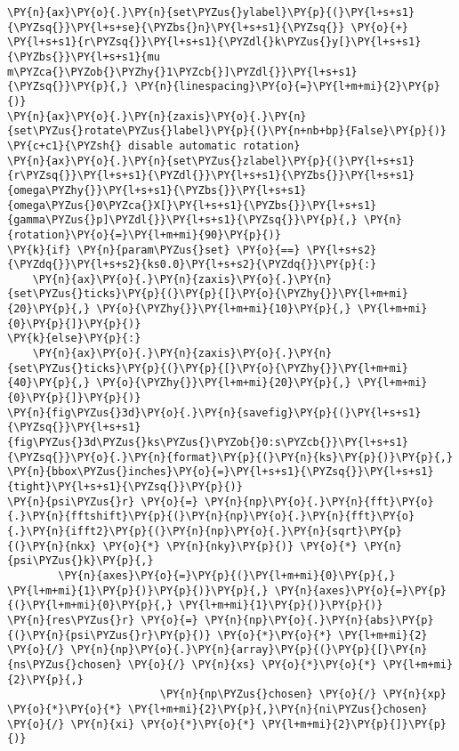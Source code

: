 \begin{Verbatim}[commandchars=\\\{\}]
\PY{n}{ax}\PY{o}{.}\PY{n}{set\PYZus{}ylabel}\PY{p}{(}\PY{l+s+s1}{\PYZsq{}}\PY{l+s+se}{\PYZbs{}n}\PY{l+s+s1}{\PYZsq{}} \PY{o}{+} \PY{l+s+s1}{r\PYZsq{}}\PY{l+s+s1}{\PYZdl{}k\PYZus{}y[}\PY{l+s+s1}{\PYZbs{}}\PY{l+s+s1}{mu m\PYZca{}\PYZob{}\PYZhy{}1\PYZcb{}]\PYZdl{}}\PY{l+s+s1}{\PYZsq{}}\PY{p}{,} \PY{n}{linespacing}\PY{o}{=}\PY{l+m+mi}{2}\PY{p}{)}
\PY{n}{ax}\PY{o}{.}\PY{n}{zaxis}\PY{o}{.}\PY{n}{set\PYZus{}rotate\PYZus{}label}\PY{p}{(}\PY{n+nb+bp}{False}\PY{p}{)}  \PY{c+c1}{\PYZsh{} disable automatic rotation}
\PY{n}{ax}\PY{o}{.}\PY{n}{set\PYZus{}zlabel}\PY{p}{(}\PY{l+s+s1}{r\PYZsq{}}\PY{l+s+s1}{\PYZdl{}}\PY{l+s+s1}{\PYZbs{}}\PY{l+s+s1}{omega\PYZhy{}}\PY{l+s+s1}{\PYZbs{}}\PY{l+s+s1}{omega\PYZus{}0\PYZca{}X[}\PY{l+s+s1}{\PYZbs{}}\PY{l+s+s1}{gamma\PYZus{}p]\PYZdl{}}\PY{l+s+s1}{\PYZsq{}}\PY{p}{,} \PY{n}{rotation}\PY{o}{=}\PY{l+m+mi}{90}\PY{p}{)}
\PY{k}{if} \PY{n}{param\PYZus{}set} \PY{o}{==} \PY{l+s+s2}{\PYZdq{}}\PY{l+s+s2}{ks0.0}\PY{l+s+s2}{\PYZdq{}}\PY{p}{:}
    \PY{n}{ax}\PY{o}{.}\PY{n}{zaxis}\PY{o}{.}\PY{n}{set\PYZus{}ticks}\PY{p}{(}\PY{p}{[}\PY{o}{\PYZhy{}}\PY{l+m+mi}{20}\PY{p}{,} \PY{o}{\PYZhy{}}\PY{l+m+mi}{10}\PY{p}{,} \PY{l+m+mi}{0}\PY{p}{]}\PY{p}{)}
\PY{k}{else}\PY{p}{:}
    \PY{n}{ax}\PY{o}{.}\PY{n}{zaxis}\PY{o}{.}\PY{n}{set\PYZus{}ticks}\PY{p}{(}\PY{p}{[}\PY{o}{\PYZhy{}}\PY{l+m+mi}{40}\PY{p}{,} \PY{o}{\PYZhy{}}\PY{l+m+mi}{20}\PY{p}{,} \PY{l+m+mi}{0}\PY{p}{]}\PY{p}{)}
\PY{n}{fig\PYZus{}3d}\PY{o}{.}\PY{n}{savefig}\PY{p}{(}\PY{l+s+s1}{\PYZsq{}}\PY{l+s+s1}{fig\PYZus{}3d\PYZus{}ks\PYZus{}\PYZob{}0:s\PYZcb{}}\PY{l+s+s1}{\PYZsq{}}\PY{o}{.}\PY{n}{format}\PY{p}{(}\PY{n}{ks}\PY{p}{)}\PY{p}{,} \PY{n}{bbox\PYZus{}inches}\PY{o}{=}\PY{l+s+s1}{\PYZsq{}}\PY{l+s+s1}{tight}\PY{l+s+s1}{\PYZsq{}}\PY{p}{)}
\PY{n}{psi\PYZus{}r} \PY{o}{=} \PY{n}{np}\PY{o}{.}\PY{n}{fft}\PY{o}{.}\PY{n}{fftshift}\PY{p}{(}\PY{n}{np}\PY{o}{.}\PY{n}{fft}\PY{o}{.}\PY{n}{ifft2}\PY{p}{(}\PY{n}{np}\PY{o}{.}\PY{n}{sqrt}\PY{p}{(}\PY{n}{nkx} \PY{o}{*} \PY{n}{nky}\PY{p}{)} \PY{o}{*} \PY{n}{psi\PYZus{}k}\PY{p}{,}
        \PY{n}{axes}\PY{o}{=}\PY{p}{(}\PY{l+m+mi}{0}\PY{p}{,} \PY{l+m+mi}{1}\PY{p}{)}\PY{p}{)}\PY{p}{,} \PY{n}{axes}\PY{o}{=}\PY{p}{(}\PY{l+m+mi}{0}\PY{p}{,} \PY{l+m+mi}{1}\PY{p}{)}\PY{p}{)}
\PY{n}{res\PYZus{}r} \PY{o}{=} \PY{n}{np}\PY{o}{.}\PY{n}{abs}\PY{p}{(}\PY{n}{psi\PYZus{}r}\PY{p}{)} \PY{o}{*}\PY{o}{*} \PY{l+m+mi}{2} \PY{o}{/} \PY{n}{np}\PY{o}{.}\PY{n}{array}\PY{p}{(}\PY{p}{[}\PY{n}{ns\PYZus{}chosen} \PY{o}{/} \PY{n}{xs} \PY{o}{*}\PY{o}{*} \PY{l+m+mi}{2}\PY{p}{,}
                        \PY{n}{np\PYZus{}chosen} \PY{o}{/} \PY{n}{xp} \PY{o}{*}\PY{o}{*} \PY{l+m+mi}{2}\PY{p}{,}\PY{n}{ni\PYZus{}chosen} \PY{o}{/} \PY{n}{xi} \PY{o}{*}\PY{o}{*} \PY{l+m+mi}{2}\PY{p}{]}\PY{p}{)}

\end{Verbatim}
